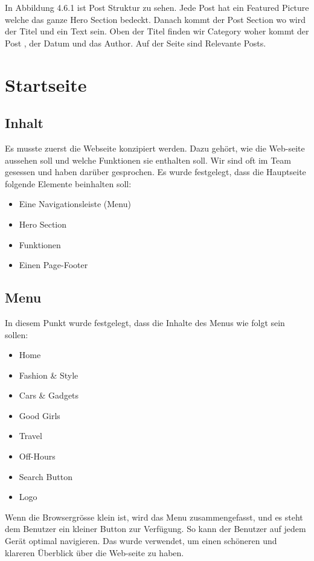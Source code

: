 In Abbildung 4.6.1 ist Post Struktur zu sehen.
Jede Post hat ein Featured Picture welche das ganze Hero Section bedeckt. Danach kommt der Post Section wo wird der Titel und ein Text sein. Oben der Titel finden wir Category woher kommt der Post , der Datum und das Author. Auf der Seite sind Relevante Posts.


\chapter{Startseite}


\section{Inhalt}
Es musste zuerst die Webseite konzipiert werden. Dazu gehört, wie die Web-seite aussehen soll und welche Funktionen sie enthalten soll. Wir sind oft im Team gesessen und haben darüber gesprochen. Es wurde festgelegt, dass die Hauptseite folgende Elemente beinhalten soll:
\begin{itemize}
\item Eine Navigationsleiste (Menu)
\item Hero Section
\item Funktionen
\item Einen Page-Footer
\end{itemize}

\section{Menu}
In diesem Punkt wurde festgelegt, dass die Inhalte des Menus wie folgt sein sollen:
\begin{itemize}
\item Home
\item Fashion \& Style
\item Cars \& Gadgets
\item Good Girls
\item Travel
\item Off-Hours
\item Search Button
\item Logo

\end{itemize}

Wenn die Browsergrösse klein ist, wird das Menu zusammengefasst, und es steht dem Benutzer ein kleiner Button zur Verfügung. So kann der Benutzer auf jedem Gerät optimal navigieren. Das wurde verwendet, um einen schöneren und klareren Überblick über die Web-seite zu haben.
